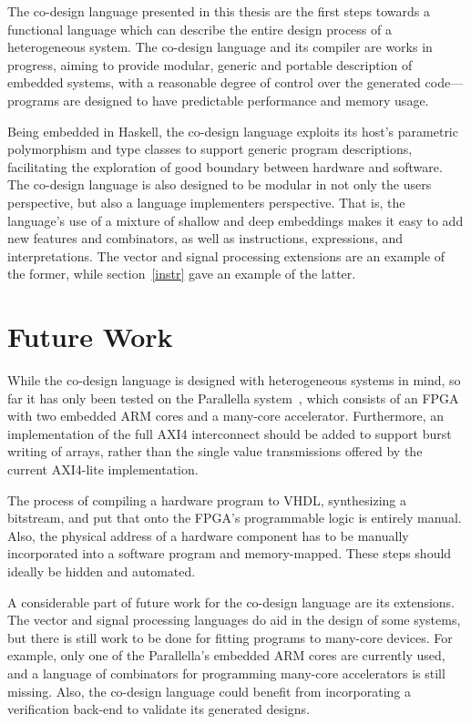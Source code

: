 \documentclass[../paper.tex]{subfiles}
\begin{document}
The co-design language presented in this thesis are the first steps towards a functional language which can describe the entire design process of a heterogeneous system. The co-design language and its compiler are works in progress, aiming to provide modular, generic and portable description of embedded systems, with a reasonable degree of control over the generated code---programs are designed to have predictable performance and memory usage.

Being embedded in Haskell, the co-design language exploits its host's parametric polymorphism and type classes to support generic program descriptions, facilitating the exploration of good boundary between hardware and software. The co-design language is also designed to be modular in not only the users perspective, but also a language implementers perspective. That is, the language's use of a mixture of shallow and deep embeddings makes it easy to add new features and combinators, as well as instructions, expressions, and interpretations. The vector and signal processing extensions are an example of the former, while section~\ref{instr} gave an example of the latter.

\section{Future Work}
\label{future}

While the co-design language is designed with heterogeneous systems in mind, so far it has only been tested on the Parallella system~\cite{olofsson2014}, which consists of an FPGA with two embedded ARM cores and a many-core accelerator. Furthermore, an implementation of the full AXI4 interconnect should be added to support burst writing of arrays, rather than the single value transmissions offered by the current AXI4-lite implementation.

The process of compiling a hardware program to VHDL, synthesizing a bitstream, and put that onto the FPGA's programmable logic is entirely manual. Also, the physical address of a hardware component has to be manually incorporated into a software program and memory-mapped. These steps should ideally be hidden and automated.

A considerable part of future work for the co-design language are its extensions. The vector and signal processing languages do aid in the design of some systems, but there is still work to be done for fitting programs to many-core devices. For example, only one of the Parallella's embedded ARM cores are currently used, and a language of combinators for programming many-core accelerators is still missing. Also, the co-design language could benefit from incorporating a verification back-end to validate its generated designs.
\end{document}
